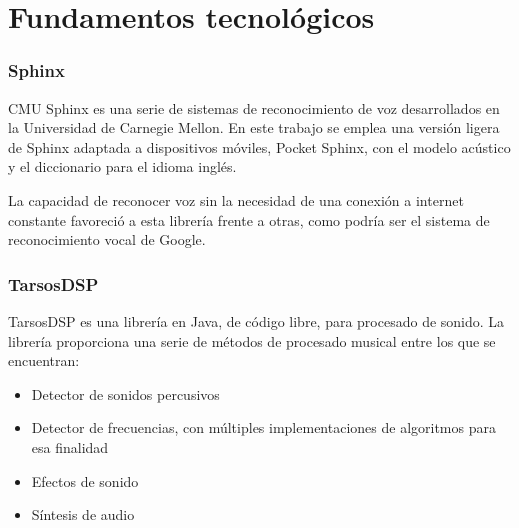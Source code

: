 \chapter{Fundamentos tecnológicos}
\label{chap:fundamentos-tecnologicos}


 \subsection{Sphinx}
 \label{subsec:sphinx}

 
 CMU Sphinx\cite{cmusphinx} es una serie de sistemas de reconocimiento de voz desarrollados en la Universidad de Carnegie Mellon.
 En este trabajo se emplea una versión ligera de Sphinx adaptada a dispositivos móviles, Pocket Sphinx, con el modelo acústico y el diccionario para el idioma inglés.
 
 La capacidad de reconocer voz sin la necesidad de una conexión a internet constante favoreció a esta librería frente a otras, como podría ser el sistema de reconocimiento vocal de Google.



 
 \subsection{TarsosDSP}
  \label{subsec:tarsos-dsp}
 TarsosDSP\cite{six2014tarsosdsp} es una librería en Java, de código libre, para procesado de sonido.
 La librería proporciona una serie de métodos de procesado musical entre los que se encuentran:
 \begin{itemize}
 	\item Detector de sonidos percusivos
 	\item Detector de frecuencias, con múltiples implementaciones de algoritmos para esa finalidad
 	\item Efectos de sonido
 	\item Síntesis de audio
 \end{itemize}
 

